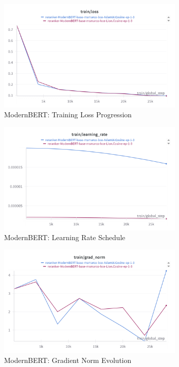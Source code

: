 \begin{figure}[H]
    \centering
    \includegraphics[width=0.8\textwidth]{Figures/modernBERT-Lion-adamW-train_loss.png}
    \caption{ModernBERT: Training Loss Progression}
    \label{fig:modernbert_train_loss}
\end{figure}

\begin{figure}[H]
    \centering
    \includegraphics[width=0.8\textwidth]{Figures/modernBERT-Lion-adamW-lrate.png}
    \caption{ModernBERT: Learning Rate Schedule}
    \label{fig:modernbert_lr}
\end{figure}

\begin{figure}[H]
    \centering
    \includegraphics[width=0.8\textwidth]{Figures/modernBERT-Lion-adamW_grad_norm.png}
    \caption{ModernBERT: Gradient Norm Evolution}
    \label{fig:modernbert_grad_norm}
\end{figure}


